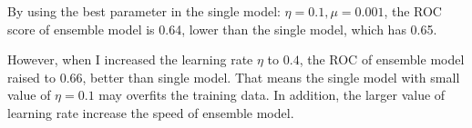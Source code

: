 \documentclass[12pt]{article}
\begin{document}
By using the best parameter in the single model: $\eta = 0.1, \mu = 0.001$, the ROC score of ensemble model is 0.64, lower than the single model, which has 0.65.

However, when I increased the learning rate $\eta$ to $0.4$, the ROC of ensemble model raised to 0.66,  better than single model. That means the single model with small value of $\eta=0.1$ may overfits the training data. In addition, the larger value of learning rate increase the speed of ensemble model.
\end{document}
